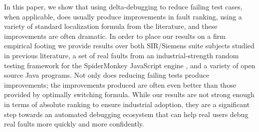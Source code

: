 In this paper, we show that using delta-debugging to reduce failing
test cases, when applicable, does usually produce improvements in
fault ranking, using a variety of standard localization formula from
the literature, and these improvements are often dramatic.  In order
to place our results on a firm empirical footing \cite{Threats} we
provide results over both SIR/Siemens \cite{Siemens} suite subjects
studied in previous literature, a set of real faults from an
industrial-strength random testing framework for the SpiderMonkey
JavaScript engine \cite{icst2014,jsfunfuzz}, and a variety of open
source Java programs.  Not only does reducing failing tests produce
improvements; the improvements produced are often even better than
those provided by optimally switching formula.  While our results are
not strong enough in terms of absolute ranking to ensure industrial
adoption, they are a significant step towards an automated debugging
ecosystem that can help real users debug real faults more quickly and
more confidently.
